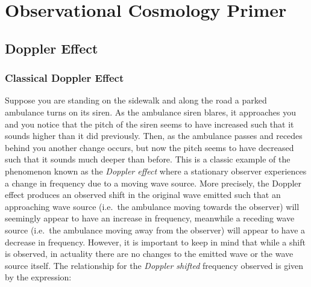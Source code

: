 \newcommand{\plusnamesingular}{}
\newcommand{\starnamesingular}{}
\newcommand{\xrefname}[1]{\protect\renewcommand{\plusnamesingular}{#1}}
\newcommand{\Xrefname}[1]{\protect\renewcommand{\starnamesingular}{#1}}
\providecommand{\cref}{\plusnamesingular~\ref}
\providecommand{\Cref}{\starnamesingular~\ref}
\providecommand{\crefformat}[2]{}
\providecommand{\Crefformat}[2]{}

\crefformat{equation}{Eq.~#2#1#3}
\Crefformat{equation}{Equation~#2#1#3}

\section{Observational Cosmology
Primer}\label{observational-cosmology-primer}

\subsection{Doppler Effect}\label{doppler-effect}

\subsubsection{Classical Doppler Effect}\label{classical-doppler-effect}

Suppose you are standing on the sidewalk and along the road a parked
ambulance turns on its siren. As the ambulance siren blares, it
approaches you and you notice that the pitch of the siren seems to have
increased such that it sounds higher than it did previously. Then, as
the ambulance passes and recedes behind you another change occurs, but
now the pitch seems to have decreased such that it sounds much deeper
than before. This is a classic example of the phenomenon known as the
\emph{Doppler effect} where a stationary observer experiences a change
in frequency due to a moving wave source. More precisely, the Doppler
effect produces an observed shift in the original wave emitted such that
an approaching wave source (i.e.~the ambulance moving towards the
observer) will seemingly appear to have an increase in frequency,
meanwhile a receding wave source (i.e.~the ambulance moving away from
the observer) will appear to have a decrease in frequency. However, it
is important to keep in mind that while a shift is observed, in
actuality there are no changes to the emitted wave or the wave source
itself. The relationship for the \emph{Doppler shifted} frequency
observed is given by the expression:

